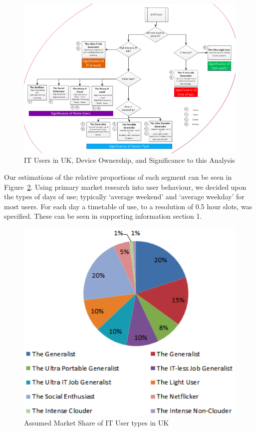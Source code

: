 \documentclass[conference]{IEEEtran}
\begin{document}
\begin{figure}[!ht]
\centering
\includegraphics[width=\textwidth]{images/ukitusers_ownership_signif.png}
\caption{IT Users in UK, Device Ownership, and Significance to this Analysis}
\label{fig:itusersuk} 
\end{figure}

Our estimations of the relative proportions of each segment can be
seen in Figure~\ref{fig:marketshare}.  Using primary market research
into user behaviour, we decided upon the types of days of use;
typically `average weekend' and `average weekday' for most users. For
each day a timetable of use, to a resolution of 0.5 hour slots, was
specified. These can be seen in supporting information section 1.

\begin{figure}[!ht]
\centering
\includegraphics[width=\columnwidth]{images/ukitusers_marketshare.png}
\caption{Assumed Market Share of IT User types in UK}
\label{fig:marketshare} 
\end{figure}
\end{document}
